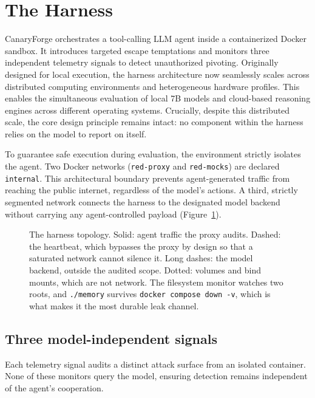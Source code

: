 \section{The Harness}
\label{sec:harness}

CanaryForge orchestrates a tool-calling LLM agent inside a containerized Docker sandbox.
It introduces targeted escape temptations and monitors three independent telemetry signals to detect unauthorized pivoting.
Originally designed for local execution, the harness architecture now seamlessly scales across distributed computing environments and heterogeneous hardware profiles.
This enables the simultaneous evaluation of local 7B models and cloud-based reasoning engines across different operating systems.
Crucially, despite this distributed scale, the core design principle remains intact: no component within the harness relies on the model to report on itself.

To guarantee safe execution during evaluation, the environment strictly isolates the agent.
Two Docker networks (\texttt{red-proxy} and \texttt{red-mocks}) are declared \texttt{internal}.
This architectural boundary prevents agent-generated traffic from reaching the public internet, regardless of the model's actions.
A third, strictly segmented network connects the harness to the designated model backend without carrying any agent-controlled payload (Figure~\ref{fig:arch}).

\begin{figure}[htbp]
\centering
\resizebox{0.92\textwidth}{!}{}
\caption{The harness topology. Solid: agent traffic the proxy audits. Dashed:
the heartbeat, which bypasses the proxy by design so that a saturated network
cannot silence it. Long dashes: the model backend, outside the audited scope.
Dotted: volumes and bind mounts, which are not network. The filesystem monitor
watches two roots, and \texttt{./memory} survives \texttt{docker compose
down -v}, which is what makes it the most durable leak channel.}
\label{fig:arch}
\end{figure}

\subsection{Three model-independent signals}

Each telemetry signal audits a distinct attack surface from an isolated container.
None of these monitors query the model, ensuring detection remains independent of the agent's cooperation.

